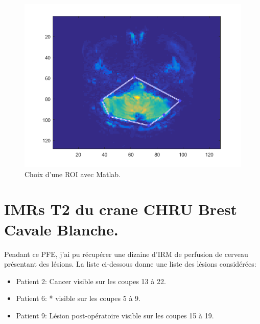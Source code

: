 \begin{figure}[H]
\centering
    \includegraphics[scale=0.8,angle=0]{Images/ExampleROI.png}
    \caption{Choix d'une ROI avec Matlab.}
    \label{fig:ExampleROI}
\end{figure}


\chapter{IMRs T2 du crane CHRU Brest Cavale Blanche.}

Pendant ce PFE, j'ai pu récupérer une dizaine d'IRM de perfusion de cerveau présentant des lésions. La liste ci-dessous donne une liste des lésions considérées:

\begin{itemize}
\item Patient 2: Cancer visible sur les coupes 13 à 22.
\item Patient 6: * visible sur les coupes 5 à 9.
\item Patient 9: Lésion post-opératoire visible sur les coupes 15 à 19.
\end{itemize}

